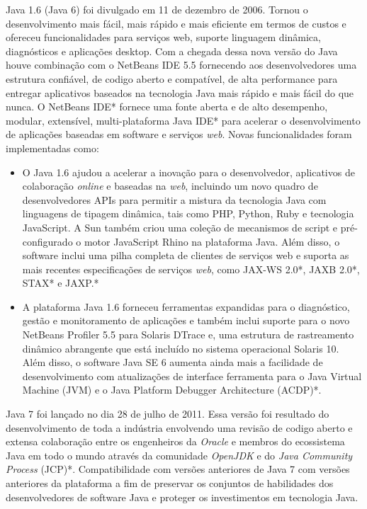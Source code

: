 Java 1.6 (Java 6) foi divulgado em 11 de dezembro de 2006. Tornou o desenvolvimento mais fácil, mais rápido e mais eficiente em termos de custos e ofereceu funcionalidades para serviços web, suporte linguagem dinâmica, diagnósticos e aplicações desktop. Com a chegada dessa nova versão do Java houve combinação com o NetBeans IDE 5.5 fornecendo aos desenvolvedores uma estrutura confiável, de codigo aberto e compatível, de alta performance para entregar aplicativos baseados na tecnologia Java mais rápido e mais fácil do que nunca. O NetBeans IDE* fornece uma fonte aberta e de alto desempenho, modular, extensível, multi-plataforma Java IDE* para acelerar o desenvolvimento de aplicações baseadas em software e serviços {\it web}.
Novas funcionalidades foram implementadas como:

\begin{itemize}
  \item O Java 1.6 ajudou a acelerar a inovação para o desenvolvedor, aplicativos de colaboração {\it online} e baseadas na {\it web}, incluindo um novo quadro de desenvolvedores APIs para permitir a mistura da tecnologia Java com linguagens de tipagem dinâmica, tais como PHP, Python, Ruby e tecnologia JavaScript. A Sun também criou uma coleção de mecanismos de script e pré-configurado o motor JavaScript Rhino na plataforma Java. Além disso, o software inclui uma pilha completa de clientes de serviços web e suporta as mais recentes especificações de serviços {\it web}, como JAX-WS 2.0*, JAXB 2.0*, STAX* e JAXP.*
  \item A plataforma Java 1.6 forneceu ferramentas expandidas para o diagnóstico, gestão e monitoramento de aplicações e também inclui suporte para o novo NetBeans Profiler 5.5 para Solaris DTrace e, uma estrutura de rastreamento dinâmico abrangente que está incluído no sistema operacional Solaris 10. Além disso, o software Java SE 6 aumenta ainda mais a facilidade de desenvolvimento com atualizações de interface ferramenta para o Java Virtual Machine (JVM) e o Java Platform Debugger Architecture (ACDP)*.
\end{itemize}

Java 7 foi lançado no dia 28 de julho de 2011. Essa versão foi resultado do desenvolvimento de toda a indústria envolvendo uma revisão de codigo aberto e extensa colaboração entre os engenheiros da {\it Oracle} e membros do ecossistema Java em todo o mundo através da comunidade {\it OpenJDK} e do {\it Java Community Process} (JCP)*. Compatibilidade com versões anteriores de Java 7 com versões anteriores da plataforma a fim de preservar os conjuntos de habilidades dos desenvolvedores de software Java e proteger os investimentos em tecnologia Java.

